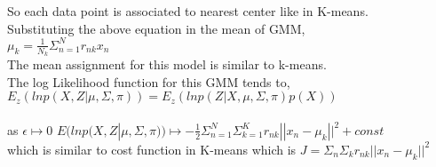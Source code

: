 \documentclass{article}
\begin{document}
So each data point is associated to nearest center like in K-means.\\
Substituting the above equation in the mean of GMM,\\
$\mu_k=\frac{1}{N_k}\Sigma_{n=1}^N r_{nk}x_n$\\
The mean assignment for this model is similar to k-means.\\
The log Likelihood function for this GMM tends to,\\
$E_z(ln p(X,Z|\mu,\Sigma,\pi)) = E_z(ln p(Z|X,\mu,\Sigma,\pi)p(X))$\\
\\as $\epsilon \mapsto 0$ $E(ln p(X,Z|\mu,\Sigma,\pi)) \mapsto -\frac{1}{2}\Sigma_{n=1}^N\Sigma_{k=1}^K r_{nk}||x_n-\mu_k||^2 + const $\\
which is similar to cost function in K-means which is $J=\Sigma_n\Sigma_k r_{nk}||x_n-\mu_k||^2$\\
\end{document}
